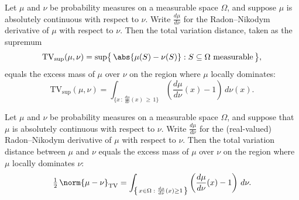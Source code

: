 \begin{theorem}
\label{CommunicationComplexity.tvDistanceSup_eq_densityPositiveIntegral_of_ac}
\leanok
{}
Let $\mu$ and $\nu$ be probability measures on a measurable space $\Omega$, and suppose
$\mu$ is absolutely continuous with respect to $\nu$. Write $\frac{d\mu}{d\nu}$ for the
Radon–Nikodym derivative of $\mu$ with respect to $\nu$. Then the total variation
distance, taken as the supremum
\[
\mathrm{TV}_{\sup}(\mu,\nu) = \sup\bigl\{\,\abs{\mu(S) - \nu(S)} : S \subseteq \Omega
\text{ measurable}\,\bigr\},
\]
equals the excess mass of $\mu$ over $\nu$ on the region where $\mu$ locally dominates:
\[
\mathrm{TV}_{\sup}(\mu,\nu) = \int_{\{x\,:\,\frac{d\mu}{d\nu}(x)\,\ge\,1\}}
\left(\frac{d\mu}{d\nu}(x) - 1\right)\,d\nu(x).
\]
\end{theorem}

\begin{theorem}
\label{CommunicationComplexity.tvDistance_eq_densityPositiveIntegral_of_ac}
\leanok
{}
Let $\mu$ and $\nu$ be probability measures on a measurable space $\Omega$, and suppose
that $\mu$ is absolutely continuous with respect to $\nu$. Write $\frac{d\mu}{d\nu}$ for
the (real-valued) Radon–Nikodym derivative of $\mu$ with respect to $\nu$. Then the
total variation distance between $\mu$ and $\nu$ equals the excess mass of $\mu$ over
$\nu$ on the region where $\mu$ locally dominates $\nu$:
\[
\tfrac{1}{2}\,\norm{\mu - \nu}_{\mathrm{TV}}
= \int_{\left\{\,x \in \Omega \;:\; \frac{d\mu}{d\nu}(x) \ge 1\,\right\}}
\left(\frac{d\mu}{d\nu}(x) - 1\right)\, d\nu.
\]
\end{theorem}

